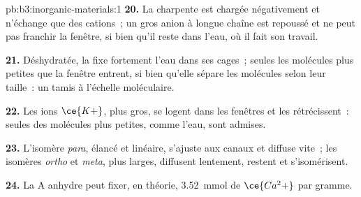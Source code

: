 \begin{solution}{pb:b3:inorganic-materials:1}
\textbf{20.} La charpente est chargée négativement et n'échange que des
cations~; un gros anion à longue chaîne est repoussé et ne peut pas
franchir la fenêtre, si bien qu'il reste dans l'eau, où il fait son
travail.

\textbf{21.} Déshydratée, la  fixe fortement l'eau dans ses
cages~; seules les molécules plus petites que la fenêtre entrent, si bien
qu'elle sépare les molécules selon leur taille~: un tamis à l'échelle
moléculaire.

\textbf{22.} Les ions $\ce{K+}$, plus gros, se logent dans les fenêtres et les rétrécissent~: seules des
molécules plus petites, comme l'eau, sont admises.

\textbf{23.} L'isomère \textit{para}, élancé et linéaire, s'ajuste aux
canaux et diffuse vite~; les isomères \textit{ortho} et \textit{meta}, plus
larges, diffusent lentement, restent et s'isomérisent.

\textbf{24.} La  A anhydre peut fixer, en théorie, \qty{3.52}{mmol} de $\ce{Ca^2+}$ par gramme.
\end{solution}
